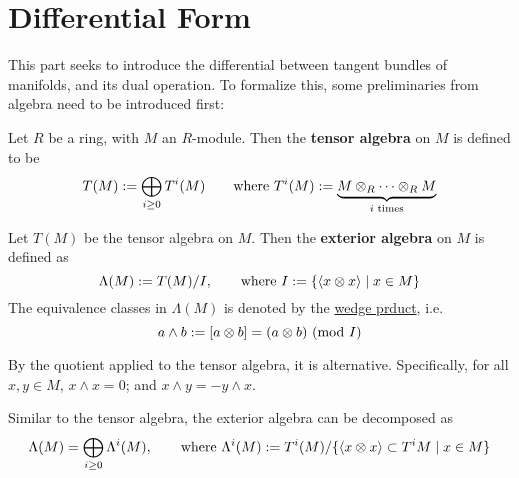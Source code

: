 \documentclass{article}
\begin{document}
\section{Differential Form}

This part seeks to introduce the differential between tangent bundles of manifolds, and its dual operation. To formalize this, some preliminaries from algebra need to be introduced first:

\begin{definition}
    Let $R$ be a ring, with $M$ an $R$-module. Then the \textbf{tensor algebra} on $M$ is defined to be
    \[
        T(M) := \bigoplus_{i \geq 0} T^i(M) \qquad\text{where } T^i(M) := \underbrace{M \otimes_R \cdots \otimes_R M}_{i \text{ times}}
    \]
\end{definition}

\begin{definition}
    Let $T(M)$ be the tensor algebra on $M$. Then the \textbf{exterior algebra} on $M$ is defined as
    \[
        \Lambda(M) := T(M) / I , \qquad \text{where } I := \left\{ \left\langle x \otimes x \right\rangle \mid x \in M \right\}
    \]
    The equivalence classes in $\Lambda(M)$ is denoted by the \underline{wedge prduct}, i.e.
    \[
        a \wedge b := [a \otimes b] = (a \otimes b) \ (\text{mod}\ I)
    \]
\end{definition}

\begin{remark}
    By the quotient applied to the tensor algebra, it is alternative. Specifically, for all $x, y \in M$, $x \wedge x = 0$; and $x \wedge y = -y \wedge x$.
\end{remark}

\begin{remark}
    Similar to the tensor algebra, the exterior algebra can be decomposed as
    \[
        \Lambda(M) = \bigoplus_{i \geq 0} \Lambda^i(M), \qquad \text{where } \Lambda^i(M) := T^i(M) / \{ \left\langle x \otimes x \right\rangle \subset T^i M \mid x \in M \}
    \]
\end{remark}
\end{document}
